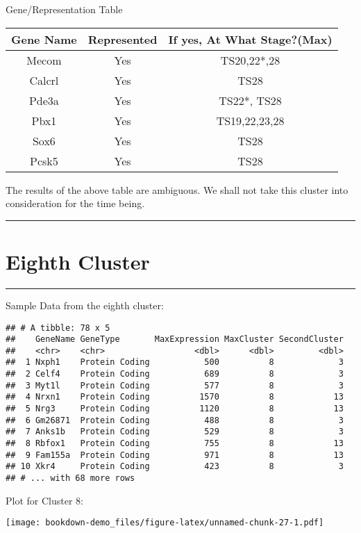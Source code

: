 \documentclass[
]{book}
\begin{document}
Gene/Representation Table

\begin{longtable}[]{@{}ccc@{}}
\toprule
Gene Name & Represented & If yes, At What Stage?(Max)\tabularnewline
\midrule
\endhead
Mecom & Yes & TS20,22*,28\tabularnewline
Calcrl & Yes & TS28\tabularnewline
Pde3a & Yes & TS22*, TS28\tabularnewline
Pbx1 & Yes & TS19,22,23,28\tabularnewline
Sox6 & Yes & TS28\tabularnewline
Pcsk5 & Yes & TS28\tabularnewline
\bottomrule
\end{longtable}

The results of the above table are ambiguous. We shall not take this cluster into consideration for the time being.

\begin{center}\rule{0.5\linewidth}{0.5pt}\end{center}

\hypertarget{eighth-cluster}{%
\chapter{Eighth Cluster}\label{eighth-cluster}}

\begin{center}\rule{0.5\linewidth}{0.5pt}\end{center}

Sample Data from the eighth cluster:

\begin{verbatim}
## # A tibble: 78 x 5
##    GeneName GeneType       MaxExpression MaxCluster SecondCluster
##    <chr>    <chr>                  <dbl>      <dbl>         <dbl>
##  1 Nxph1    Protein Coding           500          8             3
##  2 Celf4    Protein Coding           689          8             3
##  3 Myt1l    Protein Coding           577          8             3
##  4 Nrxn1    Protein Coding          1570          8            13
##  5 Nrg3     Protein Coding          1120          8            13
##  6 Gm26871  Protein Coding           488          8             3
##  7 Anks1b   Protein Coding           529          8             3
##  8 Rbfox1   Protein Coding           755          8            13
##  9 Fam155a  Protein Coding           971          8            13
## 10 Xkr4     Protein Coding           423          8             3
## # ... with 68 more rows
\end{verbatim}

Plot for Cluster 8:

\texttt{[image: bookdown-demo\_files/figure-latex/unnamed-chunk-27-1.pdf]}
\end{document}
